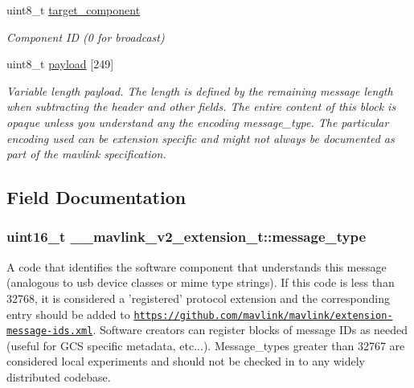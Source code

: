 \begin{DoxyCompactItemize}
uint8\+\_\+t \hyperlink{struct____mavlink__v2__extension__t_a5640a5e8258b3237aa94cc39070df91c}{target\+\_\+component}
\begin{DoxyCompactList}\small\item\em Component I\+D (0 for broadcast) \end{DoxyCompactList}\item 
uint8\+\_\+t \hyperlink{struct____mavlink__v2__extension__t_a1beba524f064a897185ff3c4b2e2abed}{payload} \mbox{[}249\mbox{]}
\begin{DoxyCompactList}\small\item\em Variable length payload. The length is defined by the remaining message length when subtracting the header and other fields. The entire content of this block is opaque unless you understand any the encoding message\+\_\+type. The particular encoding used can be extension specific and might not always be documented as part of the mavlink specification. \end{DoxyCompactList}\end{DoxyCompactItemize}


\subsection{Field Documentation}
\hypertarget{struct____mavlink__v2__extension__t_a21e0487c9ef33e2a805e6d4f913bd93f}{
\subsubsection[{message\+\_\+type}]{\setlength{\rightskip}{0pt plus 5cm}uint16\+\_\+t \+\_\+\+\_\+mavlink\+\_\+v2\+\_\+extension\+\_\+t\+::message\+\_\+type}}\label{struct____mavlink__v2__extension__t_a21e0487c9ef33e2a805e6d4f913bd93f}


A code that identifies the software component that understands this message (analogous to usb device classes or mime type strings). If this code is less than 32768, it is considered a 'registered' protocol extension and the corresponding entry should be added to \href{https://github.com/mavlink/mavlink/extension-message-ids.xml}{\tt https\+://github.\+com/mavlink/mavlink/extension-\/message-\/ids.\+xml}. Software creators can register blocks of message I\+Ds as needed (useful for G\+C\+S specific metadata, etc...). Message\+\_\+types greater than 32767 are considered local experiments and should not be checked in to any widely distributed codebase. 

